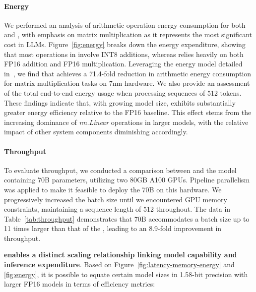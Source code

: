 \paragraph{Energy}

We performed an analysis of arithmetic operation energy consumption for both  and , with emphasis on matrix multiplication as it represents the most significant cost in LLMs. Figure~\ref{fig:energy} breaks down the energy expenditure, showing that most operations in  involve INT8 additions, whereas  relies heavily on both FP16 addition and FP16 multiplication. Leveraging the energy model detailed in~\cite{energycost, pokebnn}, we find that  achieves a 71.4-fold reduction in arithmetic energy consumption for matrix multiplication tasks on 7nm hardware. We also provide an assessment of the total end-to-end energy usage when processing sequences of 512 tokens. These findings indicate that, with growing model size,  exhibits substantially greater energy efficiency relative to the FP16  baseline. This effect stems from the increasing dominance of \emph{nn.Linear} operations in larger models, with the relative impact of other system components diminishing accordingly.

\paragraph{Throughput}

To evaluate throughput, we conducted a comparison between  and the  model containing 70B parameters, utilizing two 80GB A100 GPUs. Pipeline parallelism~\cite{gpipe} was applied to make it feasible to deploy the 70B  on this hardware. We progressively increased the batch size until we encountered GPU memory constraints, maintaining a sequence length of 512 throughout. The data in Table~\ref{tab:throughput} demonstrates that  70B accommodates a batch size up to 11 times larger than that of the , leading to an 8.9-fold improvement in throughput.

\textbf{ enables a distinct scaling relationship linking model capability and inference expenditure}. Based on Figure~\ref{fig:latency-memory-energy} and \ref{fig:energy}, it is possible to equate certain model sizes in 1.58-bit precision with larger FP16 models in terms of efficiency metrics:

